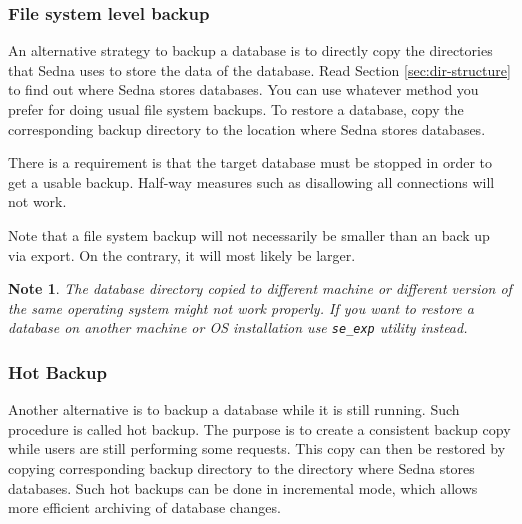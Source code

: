 \documentclass[a4paper,12pt]{article}
\newtheorem{note}{Note}    %
\begin{document}
\subsubsection{File system level backup}
\label{sec:file-system-level-backup}

An alternative strategy to backup a database is to directly copy the directories
that Sedna uses to store the data of the database. Read Section
\ref{sec:dir-structure} to find out where Sedna stores databases. You can use
whatever method you prefer for doing usual file system backups. To restore a
database, copy the corresponding backup directory to the location where Sedna
stores databases.

There is a requirement is that the target database must be stopped in order to
get a usable backup. Half-way measures such as disallowing all connections will
not work.

Note that a file system backup will not necessarily be smaller than an back up
via export. On the contrary, it will most likely be larger.

\begin{note}
The database directory copied to different machine or different version of the
same operating system might not work properly. If you want to restore a database
on another machine or OS installation use \verb!se_exp! utility instead.
\end{note}


\subsubsection{Hot Backup}

Another alternative is to backup a database while it is still running. Such
procedure is called hot backup. The purpose is to create a consistent backup
copy while users are still performing some requests. This copy can then be
restored by copying corresponding backup directory to the directory where Sedna
stores databases. Such hot backups can be done in incremental mode, which allows
more efficient archiving of database changes.
\end{document}

